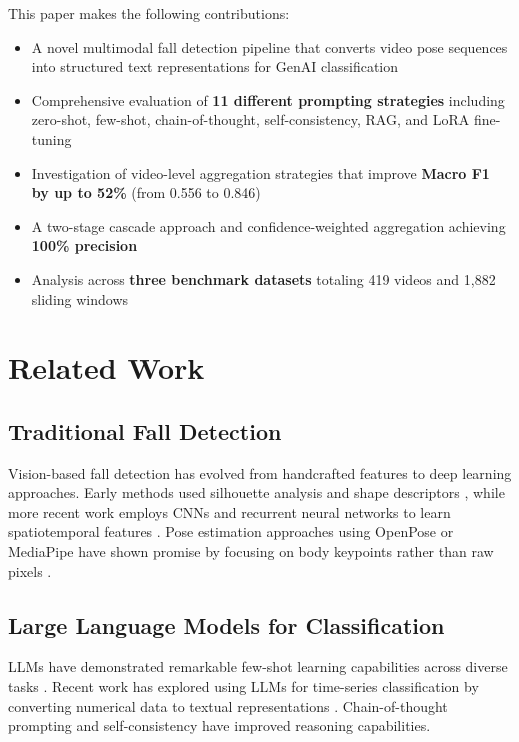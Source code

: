 \documentclass[conference]{IEEEtran}
\begin{document}
This paper makes the following contributions:
\begin{itemize}[leftmargin=*]
    \item A novel multimodal fall detection pipeline that converts video pose sequences into structured text representations for GenAI classification
    \item Comprehensive evaluation of \textbf{11 different prompting strategies} including zero-shot, few-shot, chain-of-thought, self-consistency, RAG, and LoRA fine-tuning
    \item Investigation of video-level aggregation strategies that improve \textbf{Macro F1 by up to 52\%} (from 0.556 to 0.846)
    \item A two-stage cascade approach and confidence-weighted aggregation achieving \textbf{100\% precision}
    \item Analysis across \textbf{three benchmark datasets} totaling 419 videos and 1,882 sliding windows
\end{itemize}

\section{Related Work}

\subsection{Traditional Fall Detection}
Vision-based fall detection has evolved from handcrafted features to deep learning approaches. Early methods used silhouette analysis and shape descriptors \cite{rougier2011robust}, while more recent work employs CNNs and recurrent neural networks to learn spatiotemporal features \cite{khan2020fall, chen2020fall}. Pose estimation approaches using OpenPose or MediaPipe have shown promise by focusing on body keypoints rather than raw pixels \cite{chen2020pose}.

\subsection{Large Language Models for Classification}
LLMs have demonstrated remarkable few-shot learning capabilities across diverse tasks \cite{brown2020language}. Recent work has explored using LLMs for time-series classification by converting numerical data to textual representations \cite{gruver2023large}. Chain-of-thought prompting \cite{wei2022chain} and self-consistency \cite{wang2022selfconsistency} have improved reasoning capabilities.
\end{document}
